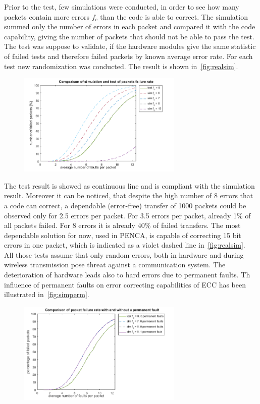 Prior to the test, few simulations were conducted, in order to see how many packets contain more errors $f_c$ than the code is able to correct. The simulation summed only the number of errors in each packet and compared it with the code capability, giving the number of packets that should not be able to pass the test. The test was suppose to validate, if the hardware modules give the same statistic of failed tests and therefore failed packets by known average error rate. For each test new randomization was conducted. The result is shown in~\autoref{fig:realsim}.

\begin{figure}[h]
\centering
\includegraphics[width=0.7\textwidth]{figures/real+simulated.png}
\caption{}
\label{fig:realsim}
\end{figure}

The test result is showed as continuous line and is compliant with the simulation result. Moreover it can be noticed, that despite the high number of 8 errors that a code can correct, a dependable (error-free) transfer of 1000 packets could be observed only for 2.5 errors per packet. For 3.5 errors per packet, already 1\% of all packets failed. For 8 errors it is already 40\% of failed transfers. The most dependable solution for now, used in PENCA, is capable of correcting 15 bit errors in one packet, which is indicated as a violet dashed line in~\autoref{fig:realsim}.\\

All those tests assume that only random errors, both in hardware and during wireless transmission pose threat against a communication system. The deterioration of hardware leads also to hard errors due to permanent faults. Th influence of permanent faults on error correcting capabilities of ECC has been illustrated in~\autoref{fig:simperm}.

\begin{figure}[h]
\centering
\includegraphics[width=0.7\textwidth]{figures/simulated+perm.png}
\caption{}
\label{fig:simperm}
\end{figure}

